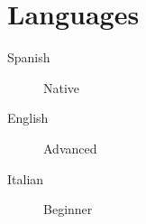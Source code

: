 \documentclass[11pt, a4paper]{article}
\begin{document}
\section{Languages}

\begin{description}
    \item[Spanish] Native
    \item[English] Advanced
    \item[Italian] Beginner
\end{description}
\end{document}
